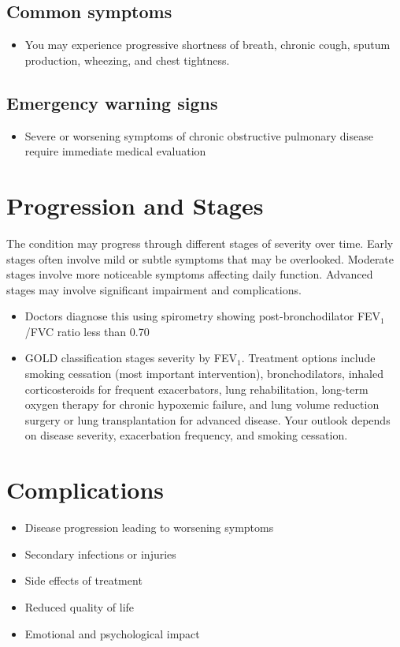 \subsection{Common symptoms}
\begin{itemize}[noitemsep]
  \item You may experience progressive shortness of breath, chronic cough, sputum production, wheezing, and chest tightness. 
  \end{itemize}

\subsection{Emergency warning signs}
\begin{itemize}[noitemsep]
  \item Severe or worsening symptoms of chronic obstructive pulmonary disease require immediate medical evaluation
\end{itemize}
\section{Progression and Stages}
The condition may progress through different stages of severity over time. Early stages often involve mild or subtle symptoms that may be overlooked. Moderate stages involve more noticeable symptoms affecting daily function. Advanced stages may involve significant impairment and complications.

\begin{itemize}[noitemsep]
  \item Doctors diagnose this using spirometry showing post-bronchodilator FEV$_1$/FVC ratio less than 0.70
  \item GOLD classification stages severity by FEV$_1$. Treatment options include smoking cessation (most important intervention), bronchodilators, inhaled corticosteroids for frequent exacerbators, lung rehabilitation, long-term oxygen therapy for chronic hypoxemic failure, and lung volume reduction surgery or lung transplantation for advanced disease. Your outlook depends on disease severity, exacerbation frequency, and smoking cessation.
\end{itemize}
\section{Complications}
\begin{itemize}[noitemsep]
  \item Disease progression leading to worsening symptoms
  \item Secondary infections or injuries
  \item Side effects of treatment
  \item Reduced quality of life
  \item Emotional and psychological impact
\end{itemize}
